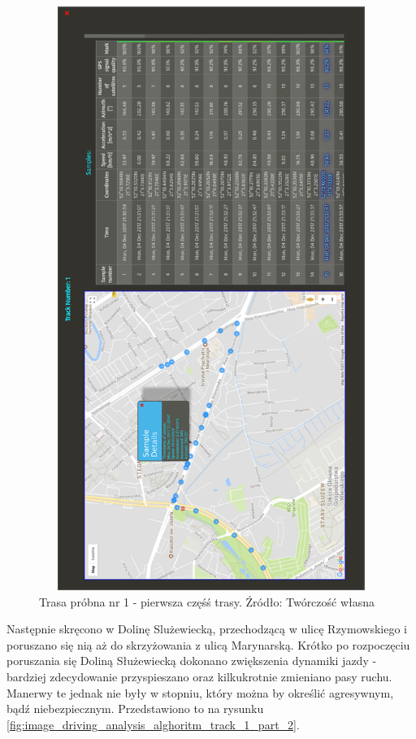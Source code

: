 \begin{figure}[H]
	\centering
	\includegraphics[height=19cm, width=13cm]{img/driving_analysis/test_track_1_lagodna.png}
	\caption{Trasa próbna nr 1 - pierwsza częśś trasy. Źródło: Twórczość własna}
	\label{fig:image_driving_analysis_alghoritm_track_1_part_1}
\end{figure}

Następnie skręcono w Dolinę Slużewiecką, przechodzącą w ulicę Rzymowskiego i poruszano się nią aż do skrzyżowania z ulicą Marynarską. Krótko po rozpoczęciu poruszania się Doliną Służewiecką dokonano zwiększenia dynamiki jazdy - bardziej zdecydowanie przyspieszano oraz kilkukrotnie zmieniano pasy ruchu. Manerwy te jednak nie były w stopniu, który można by określić agresywnym, bądź niebezpiecznym. Przedstawiono to na rysunku \ref{fig:image_driving_analysis_alghoritm_track_1_part_2}.

